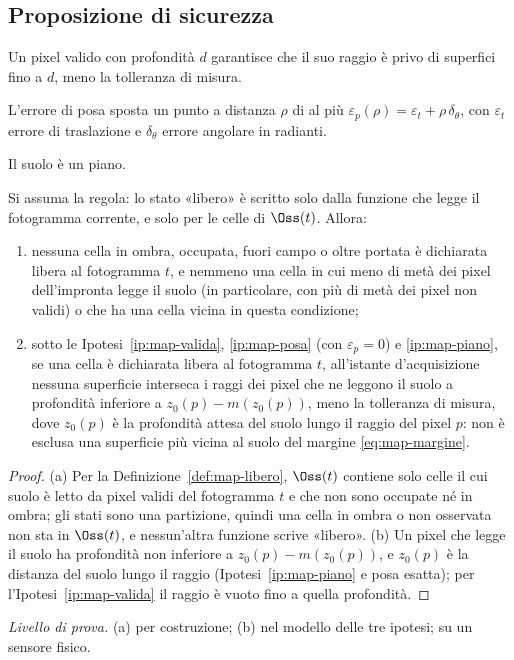 \subsection{Proposizione di sicurezza}\label{sec:map-sicurezza}

\begin{ipotesi}[Profondità valida = giusta]\label{ip:map-valida} Un pixel valido con profondità $d$ garantisce che il suo raggio è privo di superfici fino a $d$, meno la tolleranza di misura.\end{ipotesi}
\begin{ipotesi}\label{ip:map-posa} L'errore di posa sposta un punto a distanza $\rho$ di al più $\varepsilon_p(\rho)=\varepsilon_t+\rho\,\delta_\theta$, con $\varepsilon_t$ errore di traslazione e $\delta_\theta$ errore angolare in radianti.\end{ipotesi}
\begin{ipotesi}\label{ip:map-piano} Il suolo è un piano.\end{ipotesi}

\begin{proposizione}\label{prop:map-sicurezza}
Si assuma la regola: lo stato «libero» è scritto solo dalla funzione che legge il fotogramma corrente, e solo per le celle di $\Oss(t)$. Allora:
\begin{enumerate}[label=(\alph*)]
\item nessuna cella in ombra, occupata, fuori campo o oltre portata è dichiarata libera al fotogramma $t$, e nemmeno una cella in cui meno di metà dei pixel dell'impronta legge il suolo (in particolare, con più di metà dei pixel non validi) o che ha una cella vicina in questa condizione;
\item sotto le Ipotesi~\ref{ip:map-valida}, \ref{ip:map-posa} (con $\varepsilon_p=0$) e \ref{ip:map-piano}, se una cella è dichiarata libera al fotogramma $t$, all'istante d'acquisizione nessuna superficie interseca i raggi dei pixel che ne leggono il suolo a profondità inferiore a $z_0(p)-m(z_0(p))$, meno la tolleranza di misura, dove $z_0(p)$ è la profondità attesa del suolo lungo il raggio del pixel $p$: non è esclusa una superficie più vicina al suolo del margine \eqref{eq:map-margine}.
\end{enumerate}
\end{proposizione}
\begin{proof}
(a) Per la Definizione~\ref{def:map-libero}, $\Oss(t)$ contiene solo celle il cui suolo è letto da pixel validi del fotogramma $t$ e che non sono occupate né in ombra; gli stati sono una partizione, quindi una cella in ombra o non osservata non sta in $\Oss(t)$, e nessun'altra funzione scrive «libero». (b) Un pixel che legge il suolo ha profondità non inferiore a $z_0(p)-m(z_0(p))$, e $z_0(p)$ è la distanza del suolo lungo il raggio (Ipotesi~\ref{ip:map-piano} e posa esatta); per l'Ipotesi~\ref{ip:map-valida} il raggio è vuoto fino a quella profondità.
\end{proof}
\emph{Livello di prova.} (a)  per costruzione; (b)  nel modello delle tre ipotesi;  su un sensore fisico.

